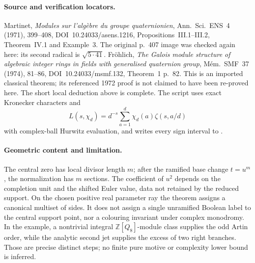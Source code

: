 \paragraph{Source and verification locators.}
Martinet, \emph{Modules sur l'alg\`ebre du groupe quaternionien},
Ann. Sci. ENS~4 (1971), 399--408,
DOI~10.24033/asens.1216, Propositions~III.1--III.2,
Theorem~IV.1 and Example~3. The original p.~407 image was checked
again here: its second radical is $\sqrt{5\cdot41}$.
Fr\"ohlich, \emph{The Galois module structure of algebraic integer
rings in fields with generalised quaternion group},
M\'em. SMF~37 (1974), 81--86, DOI~10.24033/msmf.132,
Theorem~1 p.~82. This is an imported classical theorem; its
referenced 1972 proof is not claimed to have been re-proved here.
The short local deduction above is complete.
The script  uses exact Kronecker
characters and
\[
 L(s,\chi_d)=d^{-s}\sum_{a=1}^d\chi_d(a)\zeta(s,a/d)
\]
with complex-ball Hurwitz evaluation, and writes every sign interval
to .

\paragraph{Geometric content and limitation.}
The central zero has local divisor length $m$; after the ramified
base change $t=u^m$, the normalization has $m$ sections. The
coefficient of $u^2$ depends on the completion unit and the shifted
Euler value, data not retained by the reduced support. On the chosen
positive real parameter ray the theorem assigns a canonical
multiset of sides. It does not assign a single unramified Boolean
label to the central support point, nor a colouring invariant under
complex monodromy. In the example, a nontrivial integral
$\mathbb Z[Q_8]$-module class supplies the odd Artin order, while
the analytic second jet supplies the excess of two right branches.
Those are precise distinct steps; no finite pure motive or
complexity lower bound is inferred.
